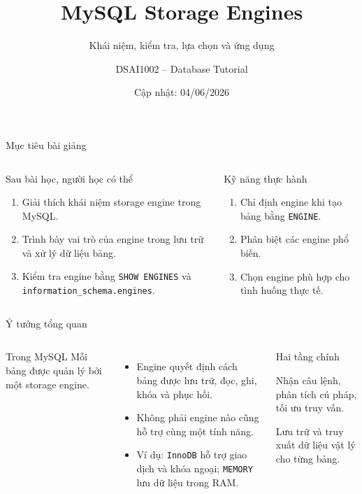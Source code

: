 \documentclass[aspectratio=169,11pt]{beamer}
\title[MySQL Storage Engines]{MySQL Storage Engines}
\subtitle{Khái niệm, kiểm tra, lựa chọn và ứng dụng}
\author{DSAI1002 -- Database Tutorial}
\date{Cập nhật: 04/06/2026}
\newcommand{\code}[1]{\texttt{#1}}
\newcommand{\smallitem}{\setlength{\itemsep}{2pt}}
\begin{document}
\begin{frame}
  \titlepage
\end{frame}

\begin{frame}{Mục tiêu bài giảng}
\begin{columns}[T,onlytextwidth]
\begin{block}{Sau bài học, người học có thể}
\begin{enumerate}\smallitem
  \item Giải thích khái niệm \alert{storage engine} trong MySQL.
  \item Trình bày vai trò của engine trong lưu trữ và xử lý dữ liệu bảng.
  \item Kiểm tra engine bằng \code{SHOW ENGINES} và \code{information\_schema.engines}.
\end{enumerate}
\end{block}
\begin{block}{Kỹ năng thực hành}
\begin{enumerate}\smallitem
  \setcounter{enumi}{3}
  \item Chỉ định engine khi tạo bảng bằng \code{ENGINE}.
  \item Phân biệt các engine phổ biến.
  \item Chọn engine phù hợp cho tình huống thực tế.
\end{enumerate}
\end{block}
\end{columns}
\end{frame}

\begin{frame}{Ý tưởng tổng quan}
\begin{columns}[T,onlytextwidth]
\begin{block}{Trong MySQL}
Mỗi bảng được quản lý bởi một \alert{storage engine}.
\end{block}
\begin{itemize}\smallitem
  \item Engine quyết định cách bảng được lưu trữ, đọc, ghi, khóa và phục hồi.
  \item Không phải engine nào cũng hỗ trợ cùng một tính năng.
  \item Ví dụ: \code{InnoDB} hỗ trợ giao dịch và khóa ngoại; \code{MEMORY} lưu dữ liệu trong RAM.
\end{itemize}
\begin{block}{Hai tầng chính}
\begin{description}\smallitem
  \item[Tầng SQL] Nhận câu lệnh, phân tích cú pháp, tối ưu truy vấn.
  \item[Tầng Engine] Lưu trữ và truy xuất dữ liệu vật lý cho từng bảng.
\end{description}
\end{block}
\end{columns}
\end{frame}
\end{document}
